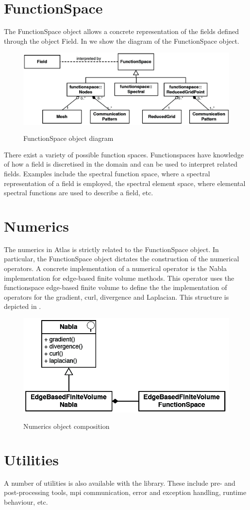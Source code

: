 \section{FunctionSpace}
The FunctionSpace object allows a concrete representation 
of the fields defined through the object Field. In 
 we show the diagram of the 
FunctionSpace object.
%
\begin{figure}
\centering
\includegraphics[scale=0.25]{imgs/functionspace.png}
\label{fig:functionspace}
\caption{FunctionSpace object diagram}
\end{figure}
%
There exist a variety of possible function spaces. Functionspaces 
have knowledge of how a field is discretised in the domain and 
can be used to interpret related fields. Examples include the 
spectral function space, where a spectral representation of a 
field is employed, the spectral element space, where elemental 
spectral functions are used to describe a field, etc.



\section{Numerics}
The numerics in Atlas is strictly related to the FunctionSpace 
object. In particular, the FunctionSpace object dictates the 
construction of the numerical operators.
A concrete implementation of a numerical operator is the Nabla 
implementation for edge-based finite volume methods. This operator 
uses the functionspace edge-based finite volume to define the 
the implementation of operators for the gradient, curl, divergence
and Laplacian. This structure is depicted in .
%
\begin{figure}
\centering
\includegraphics[scale=0.25]{imgs/numerics.png}
\label{fig:numerics}
\caption{Numerics object composition}
\end{figure}
%


\section{Utilities}
A number of utilities is also available with the library. These include 
pre- and post-processing tools, mpi communication, error and exception 
handling, runtime behaviour, etc.

